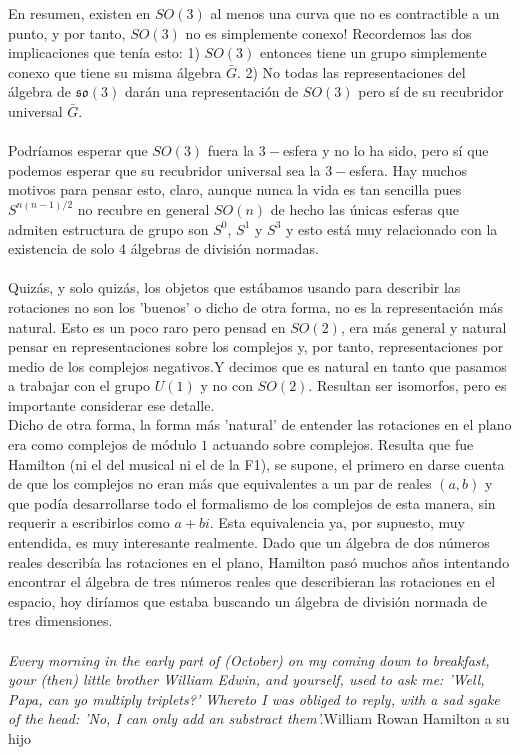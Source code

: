 \documentclass[12pt]{article}
\begin{document}
En resumen, existen en $SO(3)$ al menos una curva que no es contractible a un punto, y por tanto, $SO(3)$ no es simplemente conexo!
Recordemos las dos implicaciones que tenía esto:
1) $SO(3)$ entonces tiene un grupo simplemente conexo que tiene su misma álgebra $\bar G$.
2) No todas las representaciones del álgebra de $\mathfrak{s}\mathfrak{o}(3)$ darán una representación de $SO(3)$ pero sí de su recubridor universal $\bar G$.\\\\
Podríamos esperar que $SO(3)$ fuera la $3-$esfera y no lo ha sido, pero sí que podemos esperar que su recubridor universal sea la $3-$esfera. Hay muchos motivos para pensar esto, claro, aunque nunca la vida es tan sencilla pues $S^{n(n-1)/2}$ no recubre en general $SO(n)$ de hecho las únicas esferas que admiten estructura de grupo son $S^0$, $S^1$ y $S^3$ y esto está muy relacionado con la existencia de solo 4 álgebras de división normadas. \\\\
Quizás, y solo quizás, los objetos que estábamos usando para describir las rotaciones no son los 'buenos' o dicho de otra forma, no es la representación más natural. Esto es un poco raro pero pensad en $SO(2)$, era más general y natural pensar en representaciones sobre los complejos y, por tanto, representaciones por medio de los complejos negativos.Y decimos que es natural en tanto que pasamos a trabajar con el grupo $U(1)$ y no con $SO(2)$. Resultan ser isomorfos, pero es importante considerar ese detalle.\\
Dicho de otra forma, la forma más 'natural' de entender las rotaciones en el plano era como complejos de módulo $1$ actuando sobre complejos. Resulta que fue Hamilton (ni el del musical ni el de la F1), se supone, el primero en darse cuenta de que los complejos no eran más que equivalentes a un par de reales $(a,b)$ y que podía desarrollarse todo el formalismo de los complejos de esta manera, sin requerir a escribirlos como $a+bi$. Esta equivalencia ya, por supuesto, muy entendida, es muy interesante realmente. Dado que un álgebra de dos números reales describía las rotaciones en el plano, Hamilton pasó muchos años intentando encontrar el álgebra de tres números reales que describieran las rotaciones en el espacio, hoy diríamos que estaba buscando un álgebra de división normada de tres dimensiones.\\\\
\textit{Every morning in the early part of (October) on my coming down to breakfast, your (then) little brother William Edwin, and yourself, used to ask me: 'Well, Papa, can yo multiply triplets?' Whereto I was obliged to reply, with a sad sgake of the head: 'No, I can only add an substract them'.}{William Rowan Hamilton a su hijo }\\\\
\end{document}
